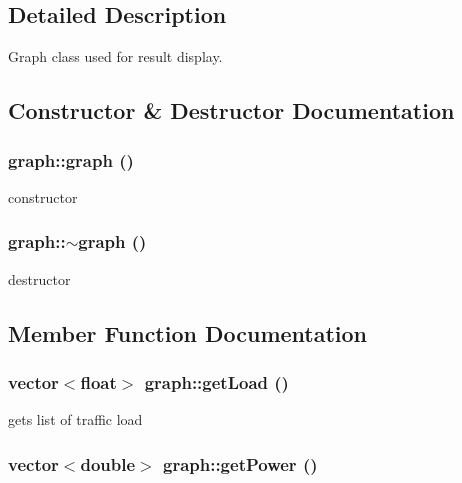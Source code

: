 \subsection{Detailed Description}
Graph class used for result display. 

\subsection{Constructor \& Destructor Documentation}
\hypertarget{classgraph_a6aaa56b4528d2fdb8f0ecd97e04f6651}{
\subsubsection[{graph}]{\setlength{\rightskip}{0pt plus 5cm}graph::graph ()}}
\label{classgraph_a6aaa56b4528d2fdb8f0ecd97e04f6651}


constructor 

\hypertarget{classgraph_aeb62eaf197cdcb4800fa016eebc3d55a}{
\subsubsection[{$\sim$graph}]{\setlength{\rightskip}{0pt plus 5cm}graph::$\sim$graph ()}}
\label{classgraph_aeb62eaf197cdcb4800fa016eebc3d55a}


destructor 



\subsection{Member Function Documentation}
\hypertarget{classgraph_ae7ba2834c9d12b59ae587db63a130f0c}{
\subsubsection[{getLoad}]{\setlength{\rightskip}{0pt plus 5cm}vector$<$float$>$ graph::getLoad ()}}
\label{classgraph_ae7ba2834c9d12b59ae587db63a130f0c}


gets list of traffic load 

\hypertarget{classgraph_ab863a80f5277b462a7c30af3c2bd005c}{
\subsubsection[{getPower}]{\setlength{\rightskip}{0pt plus 5cm}vector$<$double$>$ graph::getPower ()}}
\label{classgraph_ab863a80f5277b462a7c30af3c2bd005c}


